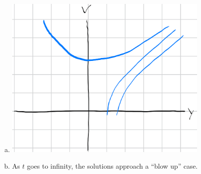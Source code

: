 \documentclass[10pt]{mypackage}
\begin{document}
\begin{enumerate}[(a)]
\begin{center}
    \end{center}
  \item \hfill
    \begin{center}
      \includegraphics[width=10cm]{images/2_2_7d.png}
    \end{center}
  \item As $t$ goes to infinity, the solutions approach a ``blow up'' case.
\end{enumerate}
\end{document}

